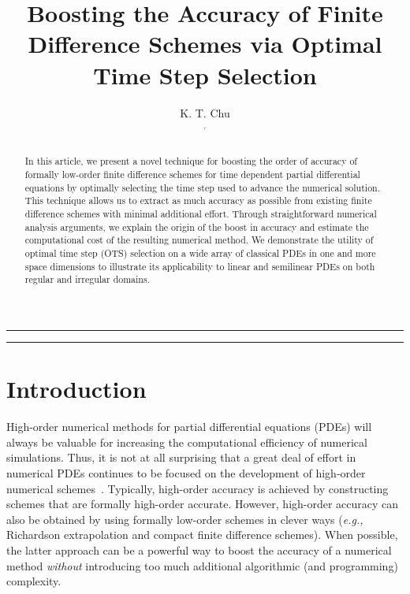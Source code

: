 \documentclass[fleqn,12pt,twoside]{article}
\def\eg{\emph{e.g., }}
\begin{document}


\title{Boosting the Accuracy of Finite Difference Schemes 
       via Optimal Time Step Selection}

\author{K. T. Chu\address{Vitamin D, Inc., Menlo Park, CA 94025}$^,$\address{Institute of High Performance Computing, A*STAR, Singapore, Singapore} 
}


\maketitle

\noindent \rule{6.3in}{1pt}

\begin{abstract}
In this article, we present a novel technique for boosting the order of 
accuracy of formally low-order finite difference schemes for time dependent 
partial differential equations by optimally selecting the time step used
to advance the numerical solution.  This technique allows us to extract as
much accuracy as possible from existing finite difference schemes with 
minimal additional effort.  Through straightforward numerical 
analysis arguments, we explain the origin of the boost in accuracy and 
estimate the computational cost of the resulting numerical 
method.  We demonstrate the utility of optimal time step (OTS) selection on a 
wide array of classical PDEs in one and more space dimensions to illustrate 
its applicability to linear and semilinear PDEs on both regular and irregular 
domains.  
\end{abstract}

\noindent \rule{6.3in}{1pt}


\section{Introduction}
High-order numerical methods for partial differential equations (PDEs) will 
always be valuable for increasing the computational efficiency of numerical 
simulations.  Thus, it is not at all surprising that a great deal of effort in 
numerical PDEs continues to be focused on the development of high-order 
numerical 
schemes~\cite{bruger_2005,gibou_2005,ito_2005,shukla_2005,shukla_2007}.  
Typically, high-order accuracy is achieved by constructing
schemes that are formally high-order accurate.  However, high-order 
accuracy can also be obtained by using formally low-order schemes in clever 
ways (\eg Richardson extrapolation and compact finite difference schemes).  
When possible, the latter approach can be a powerful way to boost the accuracy 
of a numerical method \emph{without} introducing too much additional 
algorithmic (and programming) complexity.
\end{document}
